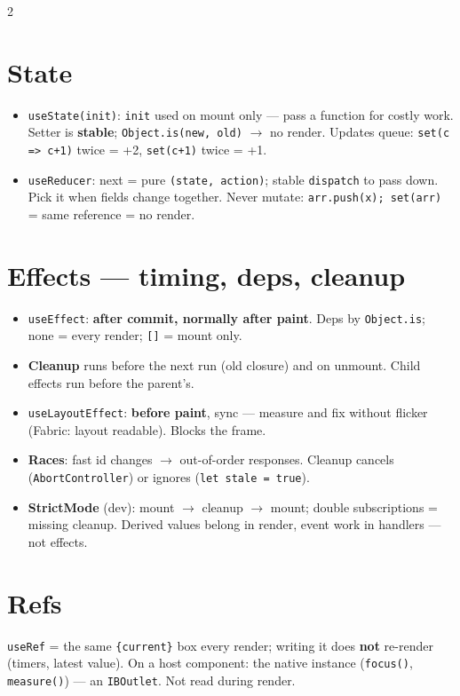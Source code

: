 \documentclass[8pt]{extarticle}
\begin{document}
\begin{multicols}{2}
\raggedright

\section{State}
\begin{itemize}
  \item \texttt{useState(init)}: \texttt{init} used on mount only — pass a function for
        costly work. Setter is \textbf{stable}; \texttt{Object.is(new, old)} $\to$ no render.
        Updates queue: \texttt{set(c => c+1)} twice = +2, \texttt{set(c+1)} twice = +1.
  \item \texttt{useReducer}: next = pure \texttt{(state, action)}; stable \texttt{dispatch}
        to pass down. Pick it when fields change together. Never mutate:
        \texttt{arr.push(x); set(arr)} = same reference = no render.
\end{itemize}

\section{Effects — timing, deps, cleanup}
\begin{itemize}
  \item \texttt{useEffect}: \textbf{after commit, normally after paint}. Deps by
        \texttt{Object.is}; none = every render; \texttt{[]} = mount only.
  \item \textbf{Cleanup} runs before the next run (old closure) and on unmount. Child
        effects run before the parent's\unverified.
  \item \texttt{useLayoutEffect}: \textbf{before paint}, sync — measure and fix without
        flicker (Fabric: layout readable). Blocks the frame.
  \item \textbf{Races}: fast id changes $\to$ out-of-order responses. Cleanup cancels
        (\texttt{AbortController}) or ignores (\texttt{let stale = true}).
  \item \textbf{StrictMode} (dev): mount $\to$ cleanup $\to$ mount; double subscriptions =
        missing cleanup. Derived values belong in render, event work in handlers — not effects.
\end{itemize}

\section{Refs}
\texttt{useRef} = the same \texttt{\{current\}} box every render; writing it does
\textbf{not} re-render (timers, latest value). On a host component: the native instance
(\texttt{focus()}, \texttt{measure()}) — an \texttt{IBOutlet}. Not read during render.


\end{multicols}
\end{document}
